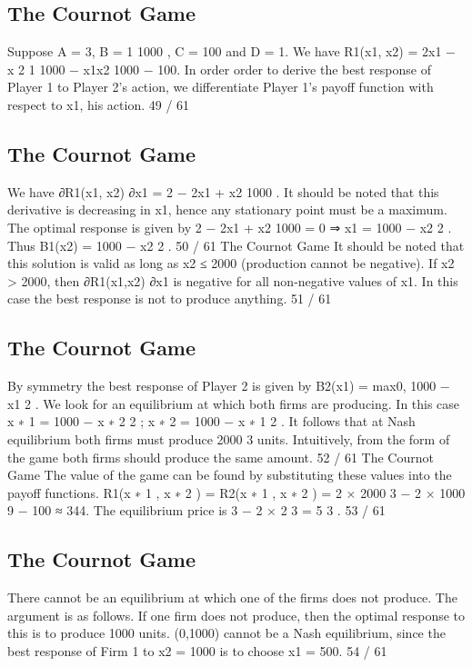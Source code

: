 \documentclass[]{report}
\begin{document}
\subsection{The Cournot Game}
Suppose A = 3, B =
1
1000 , C = 100 and D = 1.
We have
R1(x1, x2) = 2x1 −
x
2
1
1000
−
x1x2
1000
− 100.
In order order to derive the best response of Player 1 to Player 2’s
action, we differentiate Player 1’s payoff function with respect to
x1, his action.
49 / 61
\subsection{The Cournot Game}
We have
∂R1(x1, x2)
∂x1
= 2 −
2x1 + x2
1000
.
It should be noted that this derivative is decreasing in x1, hence
any stationary point must be a maximum.
The optimal response is given by
2 −
2x1 + x2
1000
= 0 ⇒ x1 = 1000 −
x2
2
.
Thus B1(x2) = 1000 −
x2
2
.
50 / 61
The Cournot Game
It should be noted that this solution is valid as long as x2 ≤ 2000
(production cannot be negative).
If x2 > 2000, then ∂R1(x1,x2)
∂x1
is negative for all non-negative values
of x1.
In this case the best response is not to produce anything.
51 / 61
\subsection{The Cournot Game}
By symmetry the best response of Player 2 is given by
B2(x1) = max{0, 1000 −
x1
2
}.
We look for an equilibrium at which both firms are producing. In
this case
x
∗
1 = 1000 −
x
∗
2
2
; x
∗
2 = 1000 −
x
∗
1
2
.
It follows that at Nash equilibrium both firms must produce 2000
3
units.
Intuitively, from the form of the game both firms should produce
the same amount.
52 / 61
The Cournot Game
The value of the game can be found by substituting these values
into the payoff functions.
R1(x
∗
1
, x
∗
2
) = R2(x
∗
1
, x
∗
2
) = 2 ×
2000
3
− 2 ×
1000
9
− 100 ≈ 344.
The equilibrium price is 3 − 2 ×
2
3 =
5
3
.
53 / 61
\subsection{The Cournot Game}
There cannot be an equilibrium at which one of the firms does not
produce. The argument is as follows.
If one firm does not produce, then the optimal response to this is
to produce 1000 units.
(0,1000) cannot be a Nash equilibrium, since the best response of
Firm 1 to x2 = 1000 is to choose x1 = 500.
54 / 61
\end{document}

